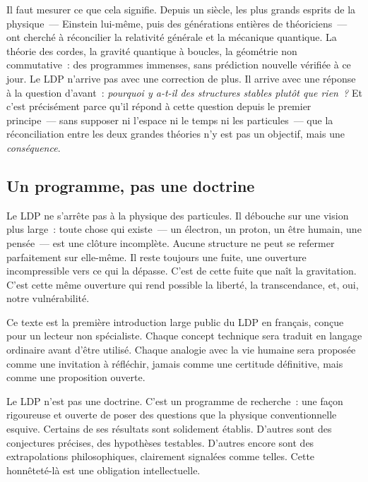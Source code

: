 \documentclass[12pt, a4paper, openright]{book}
\begin{document}
\medskip

Il faut mesurer ce que cela signifie. Depuis un siècle, les plus grands esprits de la physique~--- Einstein lui-même, puis des générations entières de théoriciens~--- ont cherché à réconcilier la relativité générale et la mécanique quantique. La théorie des cordes, la gravité quantique à boucles, la géométrie non commutative~: des programmes immenses, sans pré\-diction nouvelle vérifiée à ce jour. Le LDP n'arrive pas avec une correction de plus. Il arrive avec une réponse à la question d'avant~: \emph{pourquoi y a-t-il des structures stables plutôt que rien~?} Et c'est précisément parce qu'il répond à cette question depuis le premier principe~--- sans supposer ni l'espace ni le temps ni les particules~--- que la réconciliation entre les deux grandes théories n'y est pas un objectif, mais une \emph{conséquence}.

\subsection*{Un programme, pas une doctrine}

Le LDP ne s'arrête pas à la physique des particules. Il débouche sur une vision plus large~: toute chose qui existe~--- un électron, un proton, un être humain, une pensée~--- est une clôture incomplète. Aucune structure ne peut se refermer parfaitement sur elle-même. Il reste toujours une fuite, une ouverture incompressible vers ce qui la dépasse. C'est de cette fuite que naît la gravitation. C'est cette même ouverture qui rend possible la liberté, la transcendance, et, oui, notre vulnérabilité.

\medskip

Ce texte est la première introduction large public du LDP en français, conçue pour un lecteur non spécialiste. Chaque concept technique sera traduit en langage ordinaire avant d'être utilisé. Chaque analogie avec la vie humaine sera proposée comme une invitation à réfléchir, jamais comme une certitude définitive, mais comme une proposition ouverte.

\medskip

Le LDP n'est pas une doctrine. C'est un programme de recherche~: une façon rigoureuse et ouverte de poser des questions que la physique conventionnelle esquive. Certains de ses résultats sont solidement établis. D'autres sont des conjectures précises, des hypothèses testables. D'autres encore sont des extrapolations philosophiques, clairement signalées comme telles. Cette honnêteté-là est une obligation intellectuelle.
\end{document}
